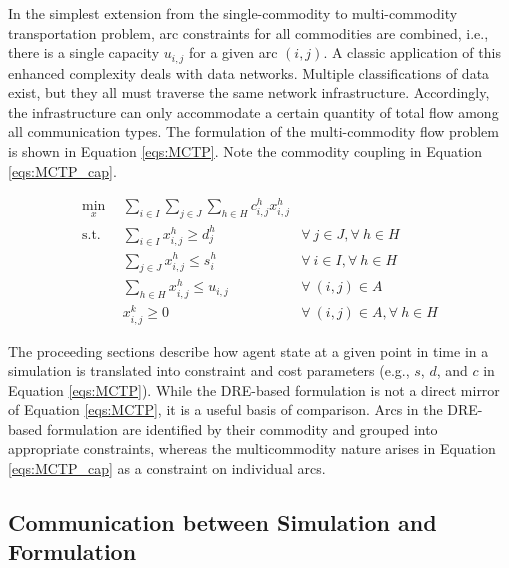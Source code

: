 In the simplest extension from the single-commodity to multi-commodity
transportation problem, arc constraints for all commodities are combined, i.e.,
there is a single capacity $u_{i,j}$ for a given arc $(i, j)$. A classic
application of this enhanced complexity deals with data networks. Multiple
classifications of data exist, but they all must traverse the same network
infrastructure. Accordingly, the infrastructure can only accommodate a certain
quantity of total flow among all communication types. The formulation of the
multi-commodity flow problem is shown in Equation \ref{eqs:MCTP}. Note the
commodity coupling in Equation \ref{eqs:MCTP_cap}.

\begin{subequations}\label{eqs:MCTP}
  \begin{align}
    \min_{x} \:\: & 
    \sum_{i \in I}\sum_{j \in J}\sum_{h \in H} c_{i,j}^{h} x_{i,j}^{h}
    & \label{eqs:MCTP_obj} \\
    \text{s.t.} \:\: 
    &
    \sum_{i \in I} x_{i,j}^{h} \geq d_{j}^{h}
    & 
    \forall \: j \in J, \forall \: h \in H \label{eqs:MCTP_dem} \\
    &
    \sum_{j \in J} x_{i,j}^{h} \leq s_{i}^{h}
    &
    \forall \: i \in I, \forall \: h \in H \label{eqs:MCTP_sup} \\
    &
    \sum_{h \in H} x_{i,j}^{h} \leq u_{i,j}
    & 
    \forall \: (i, j) \in A \label{eqs:MCTP_cap} \\
    &
    x_{i,j}^{k} \geq 0
    &
    \forall \: (i, j) \in A, \forall \: h \in H \label{eqs:MCTP_x}
  \end{align}
\end{subequations}

The proceeding sections describe how agent state at a given point in time in a
simulation is translated into constraint and cost parameters (e.g., $s$, $d$,
and $c$ in Equation \ref{eqs:MCTP}). While the DRE-based formulation is not a
direct mirror of Equation \ref{eqs:MCTP}, it is a useful basis of
comparison. Arcs in the DRE-based formulation are identified by their commodity
and grouped into appropriate constraints, whereas the multicommodity nature
arises in Equation \ref{eqs:MCTP_cap} as a constraint on individual arcs.

\subsection{Communication between Simulation and Formulation}\label{meth:comm}

